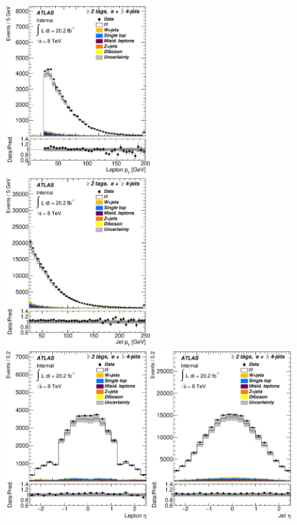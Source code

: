\begin{figure}[!hb]
\begin{center}

		\includegraphics[height=65mm]{chapters/whel/figures/control_Plots2/bTag_2incl/LeptonPt_el}
		\includegraphics[height=65mm]{chapters/whel/figures/control_Plots2/bTag_2incl/JetPt_el}\\
		\includegraphics[height=65mm]{chapters/whel/figures/control_Plots2/bTag_2incl/LeptonEta_el}
		\includegraphics[height=65mm]{chapters/whel/figures/control_Plots2/bTag_2incl/JetEta_el}\\

\end{center}
\end{figure}
